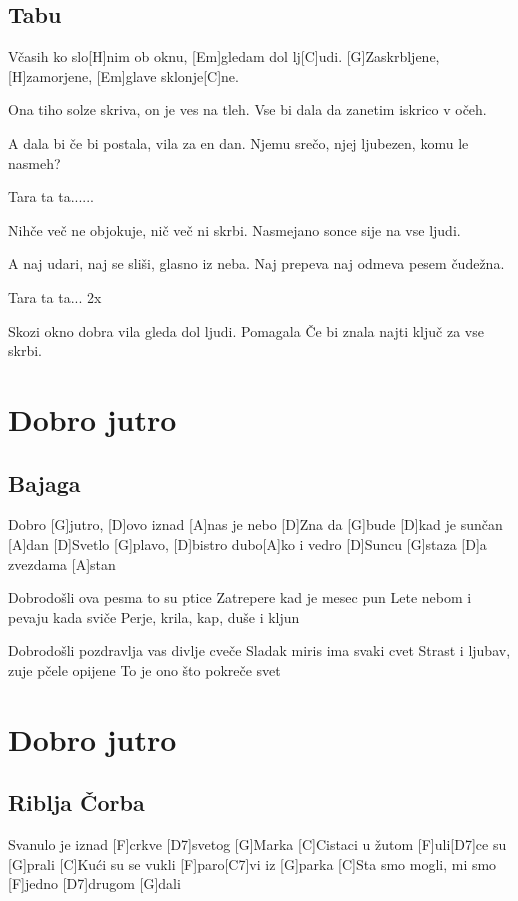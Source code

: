 \documentclass[a4paper,12pt]{article}
\begin{document}
\begin{multicols}{2}
\subsection*{Tabu}
\begin{guitar}
[G]Včasih ko slo[H]nim ob oknu, [Em]gledam dol lj[C]udi.
[G]Zaskrbljene, [H]zamorjene, [Em]glave sklonje[C]ne.


Ona tiho solze skriva, on je ves na tleh.
Vse bi dala da zanetim iskrico v očeh.


A dala bi če bi postala, vila za en dan.
Njemu srečo, njej ljubezen, komu le nasmeh?


Tara ta ta......


Nihče več ne objokuje, nič več ni skrbi.
Nasmejano sonce sije na vse ljudi.


A naj udari, naj se sliši, glasno iz neba.
Naj prepeva naj odmeva pesem čudežna.


Tara ta ta... 2x


Skozi okno dobra vila gleda dol ljudi.
Pomagala Če bi znala najti ključ za vse skrbi.

\end{guitar}
\section{Dobro jutro}
\subsection*{Bajaga}
\begin{guitar}
[D]Dobro [G]jutro, [D]ovo iznad [A]nas je nebo
[D]Zna da [G]bude [D]kad je sunčan [A]dan
[D]Svetlo [G]plavo, [D]bistro dubo[A]ko i vedro
[D]Suncu [G]staza [D]a zvezdama [A]stan


Dobrodošli ova pesma to su ptice
Zatrepere kad je mesec pun
Lete nebom i pevaju kada sviče
Perje, krila, kap, duše i kljun


Dobrodošli pozdravlja vas divlje cveče
Sladak miris ima svaki cvet
Strast i ljubav, zuje pčele opijene
To je ono što pokreče svet

\end{guitar}
\section{Dobro jutro}
\subsection*{Riblja Čorba}
\begin{guitar}
[C]Svanulo je iznad [F]crkve [D7]svetog [G]Marka
[C]Cistaci u žutom [F]uli[D7]ce su [G]prali
[C]Kući su se vukli [F]paro[C7]vi iz [G]parka
[C]Sta smo mogli, mi smo [F]jedno [D7]drugom [G]dali



\end{guitar}
\end{multicols}
\end{document}
